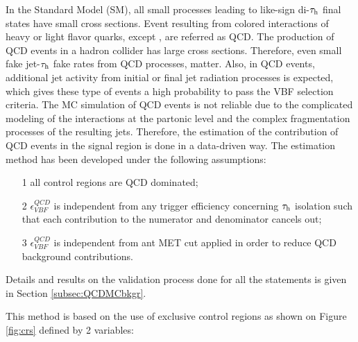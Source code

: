 In the Standard Model (SM), all small processes leading to like-sign di-$\tau_{\text{h}}$ final states have small cross sections. Event resulting from colored interactions of heavy or light flavor quarks, except \ttbar, are referred as QCD. The production of QCD events in a hadron collider has large cross sections. Therefore, even small fake jet-$\tau_{\text{h}}$ fake rates from QCD processes, matter. Also, in QCD events, additional jet activity from initial or final jet radiation processes is expected, which gives these type of events a high probability to pass the VBF selection criteria.
The MC simulation of QCD events is not reliable due to the complicated modeling of the interactions at the partonic level and the complex fragmentation processes of the resulting jets. Therefore, the estimation of the contribution of QCD events in the signal region is done in a data-driven way. The estimation method has been developed under the following assumptions:
\begin{itemize}
	\item[1] all control regions are QCD dominated;
	\item[2] $\epsilon^{QCD}_{VBF}$ is independent from any trigger efficiency concerning $\tau_{\text{h}}$ isolation such that each contribution to the numerator and denominator cancels out;
	\item[3] $\epsilon^{QCD}_{VBF}$ is independent from ant MET cut applied in order to reduce QCD background contributions. 
\end{itemize}

Details and results on the validation process done for all the statements is given in Section \ref{subsec:QCDMCbkgr}.

This method is based on the use of exclusive control regions as shown on Figure \ref{fig:crs} defined by 2 variables:

